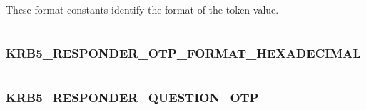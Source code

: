 \documentclass[letterpaper,10pt,english]{sphinxmanual}
\begin{document}
\begin{fulllineitems}
\label{appdev/refs/macros/KRB5_RESPONDER_OTP_FORMAT_DECIMAL:KRB5_RESPONDER_OTP_FORMAT_DECIMAL}
\end{fulllineitems}


These format constants identify the format of the token value.

\begin{tabulary}{\linewidth}{|L|L|}
\hline

 & 
\\
\hline\end{tabulary}



\subsubsection{KRB5\_RESPONDER\_OTP\_FORMAT\_HEXADECIMAL}
\label{appdev/refs/macros/KRB5_RESPONDER_OTP_FORMAT_HEXADECIMAL:krb5-responder-otp-format-hexadecimal-data}\label{appdev/refs/macros/KRB5_RESPONDER_OTP_FORMAT_HEXADECIMAL::doc}\label{appdev/refs/macros/KRB5_RESPONDER_OTP_FORMAT_HEXADECIMAL:krb5-responder-otp-format-hexadecimal}

\begin{fulllineitems}
\label{appdev/refs/macros/KRB5_RESPONDER_OTP_FORMAT_HEXADECIMAL:KRB5_RESPONDER_OTP_FORMAT_HEXADECIMAL}
\end{fulllineitems}


\begin{tabulary}{\linewidth}{|L|L|}
\hline

 & 
\\
\hline\end{tabulary}



\subsubsection{KRB5\_RESPONDER\_QUESTION\_OTP}
\label{appdev/refs/macros/KRB5_RESPONDER_QUESTION_OTP:krb5-responder-question-otp}\label{appdev/refs/macros/KRB5_RESPONDER_QUESTION_OTP:krb5-responder-question-otp-data}\label{appdev/refs/macros/KRB5_RESPONDER_QUESTION_OTP::doc}
\end{document}
